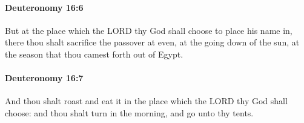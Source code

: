 		\paragraph{Deuteronomy 16:6} %
			\label{DEUTERONOMY-16-6}

			But at the place which the LORD thy God shall choose to place his name in, there thou shalt sacrifice the passover at even, at the going down of the sun, at the season that thou camest forth out of Egypt.


		\paragraph{Deuteronomy 16:7} %
			\label{DEUTERONOMY-16-7}

			And thou shalt roast and eat it in the place which the LORD thy God shall choose: and thou shalt turn in the morning, and go unto thy tents.


